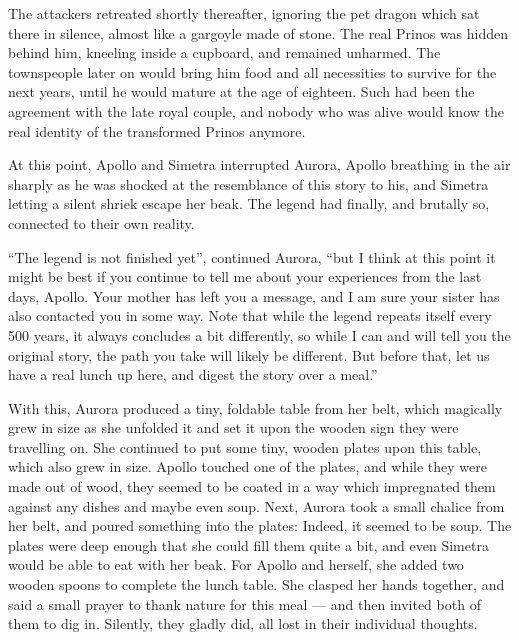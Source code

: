 The attackers retreated shortly thereafter, ignoring the pet dragon which sat there in silence, almost like a gargoyle made of stone. The real Prinos was hidden behind him, kneeling inside a cupboard, and remained unharmed. The townspeople later on would bring him food and all necessities to survive for the next years, until he would mature at the age of eighteen. Such had been the agreement with the late royal couple, and nobody who was alive would know the real identity of the transformed Prinos anymore.

\froufrou{}

At this point, Apollo and Simetra interrupted Aurora, Apollo breathing in the air sharply as he was shocked at the resemblance of this story to his, and Simetra letting a silent shriek escape her beak. The legend had finally, and brutally so, connected to their own reality.

\enquote{The legend is not finished yet}, continued Aurora, \enquote{but I think at this point it might be best if you continue to tell me about your experiences from the last days, Apollo. Your mother has left you a message, and I am sure your sister has also contacted you in some way. Note that while the legend repeats itself every 500 years, it always concludes a bit differently, so while I can and will tell you the original story, the path you take will likely be different. But before that, let us have a real lunch up here, and digest the story over a meal.}

With this, Aurora produced a tiny, foldable table from her belt, which magically grew in size as she unfolded it and set it upon the wooden sign they were travelling on. She continued to put some tiny, wooden plates upon this table, which also grew in size. Apollo touched one of the plates, and while they were made out of wood, they seemed to be coated in a way which impregnated them against any dishes and maybe even soup. Next, Aurora took a small chalice from her belt, and poured something into the plates: Indeed, it seemed to be soup. The plates were deep enough that she could fill them quite a bit, and even Simetra would be able to eat with her beak. For Apollo and herself, she added two wooden spoons to complete the lunch table. She clasped her hands together, and said a small prayer to thank nature for this meal --- and then invited both of them to dig in. Silently, they gladly did, all lost in their individual thoughts.
